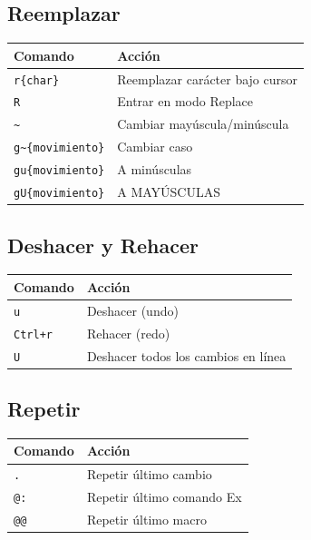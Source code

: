 \documentclass[
  doc,
  floatsintext,
  longtable,
  a4paper,
  nolmodern,
  notxfonts,
  notimes,
  12pt,
  colorlinks=true,linkcolor=blue,citecolor=blue,urlcolor=blue]{apa7}
\newcounter{none} %
\begin{document}
\subsection{Reemplazar}\label{reemplazar}

{\def\LTcaptype{none} %
\begin{longtable}[]{@{}ll@{}}
\toprule\noalign{}
Comando & Acción \\
\midrule\noalign{}
\endhead
\bottomrule\noalign{}
\endlastfoot
\texttt{r\{char\}} & Reemplazar carácter bajo cursor \\
\texttt{R} & Entrar en modo Replace \\
\texttt{\textasciitilde{}} & Cambiar mayúscula/minúscula \\
\texttt{g\textasciitilde{}\{movimiento\}} & Cambiar caso \\
\texttt{gu\{movimiento\}} & A minúsculas \\
\texttt{gU\{movimiento\}} & A MAYÚSCULAS \\
\end{longtable}
}

\subsection{Deshacer y Rehacer}\label{deshacer-y-rehacer}

{\def\LTcaptype{none} %
\begin{longtable}[]{@{}ll@{}}
\toprule\noalign{}
Comando & Acción \\
\midrule\noalign{}
\endhead
\bottomrule\noalign{}
\endlastfoot
\texttt{u} & Deshacer (undo) \\
\texttt{Ctrl+r} & Rehacer (redo) \\
\texttt{U} & Deshacer todos los cambios en línea \\
\end{longtable}
}

\subsection{Repetir}\label{repetir}

{\def\LTcaptype{none} %
\begin{longtable}[]{@{}ll@{}}
\toprule\noalign{}
Comando & Acción \\
\midrule\noalign{}
\endhead
\bottomrule\noalign{}
\endlastfoot
\texttt{.} & Repetir último cambio \\
\texttt{@:} & Repetir último comando Ex \\
\texttt{@@} & Repetir último macro \\
\end{longtable}
}
\end{document}

